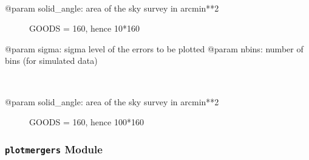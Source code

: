 \documentclass[letterpaper,10pt,english]{sphinxmanual}
\begin{document}
\begin{fulllineitems}
\label{SamPy.herschel:SamPy.herschel.plotluminosityfunctions.plot_luminosityfunctionKDE}~\begin{description}
\item[{@param solid\_angle: area of the sky survey in arcmin**2}] \leavevmode
GOODS = 160, hence 10*160

\end{description}

@param sigma: sigma level of the errors to be plotted
@param nbins: number of bins (for simulated data)

\end{fulllineitems}



\begin{fulllineitems}
\label{SamPy.herschel:SamPy.herschel.plotluminosityfunctions.plot_luminosityfunctionPaper}~\begin{description}
\item[{@param solid\_angle: area of the sky survey in arcmin**2}] \leavevmode
GOODS = 160, hence 100*160

\end{description}

\end{fulllineitems}



\subsubsection{\texttt{plotmergers} Module}
\label{SamPy.herschel:module-SamPy.herschel.plotmergers}\label{SamPy.herschel:plotmergers-module}
\end{document}
